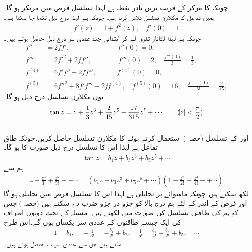 چونکہ   کا  مرکز  کے قریب ترین نادر نقطہ  ہے لہٰذا تسلسل قرص  میں مرتکز ہو گا۔
\quad {}\\
ہمیں تفاعل  کا مکلارن تسلسل تلاش کرنا ہے۔ چونکہ  ہے لہٰذا درج ذیل لکھا جا سکتا ہے۔
\begin{align*}
f'(z)=1+f^2(z),\quad f'(0)=1
\end{align*}
چونکہ  ہے لہٰذا لگاتار تفرق لے کر ابتدائی چند عددی سر درج ذیل حاصل ہوتے ہیں۔
\begin{align*}
f''&=2ff',\quad \quad\quad \quad \quad \quad \quad  f''(0)=0,\\
f'''&=2f'^2+2ff'',\quad \quad\quad \quad  f'''(0)=2, \quad \frac{f'''(0)}{3!}=\frac{1}{3},\\
f^{(4)}&=6f'f''+2ff''',\quad \quad \quad f^{(4)}(0)=0,\\
f^{(5)}&=6f''^2+8f'f'''+2ff^{(4)},\quad f^{(5)}(0)=16,\quad \frac{f^{(5)}(0)}{5!}=\frac{2}{15},
\end{align*}
یوں مکلارن تسلسل درج ذیل ہو گا۔
\begin{align}
\tan z=z+\frac{1}{3}z^3+\frac{2}{15}z^5+\frac{17}{315}z^7+\cdots \quad \quad (\abs{z}<\frac{\pi}{2})
\end{align}
\quad {}\\
 اور  کے تسلسل (حصہ ) استعمال کرتے ہوئے  کا مکلارن تسلسل حاصل کریں۔چونکہ  طاق تفاعل ہے لہٰذا اس کا تسلسل درج ذیل صورت کا ہو گا۔
\begin{align*}
\tan z=b_1z+b_3z^3+b_5z^5+\cdots
\end{align*}
ہم سے 
\begin{align*}
z-\frac{z^3}{3!}+\frac{z^5}{5!}-+\cdots=(b_1z+b_3z^3+b_5z^5+\cdots)(1-\frac{z^2}{2!}+\frac{z^4}{4!}-+\cdots)
\end{align*}
لکھ سکتے ہیں۔چونکہ  ماسوائے  پر تحلیلی ہے لہٰذا اس کا تسلسل قرص  میں تحلیلی ہو گا اور قرص کے اندر  کے لئے ہم درج بالا کو جزو در جزو ضرب دے سکتے ہیں (حصہ ) جس کو ہم   کی طاقتی تسلسل کی صورت میں لکھتے ہیں۔ مسئلہ  کے تحت دونوں اطراف  کی ایک جیسے طاقتوں کے عددی سر یکساں ہوں گے۔اس طرح 
\begin{align*}
1=b_1,\quad -\frac{1}{3!}=-\frac{b_1}{2!}+b_3, \quad \frac{1}{5!}=\frac{b_1}{4!}-\frac{b_3}{2!}+b_5,\quad \cdots
\end{align*} 
ملتے ہیں جن سے عددی سر ، ،  حاصل ہوتے ہیں۔

